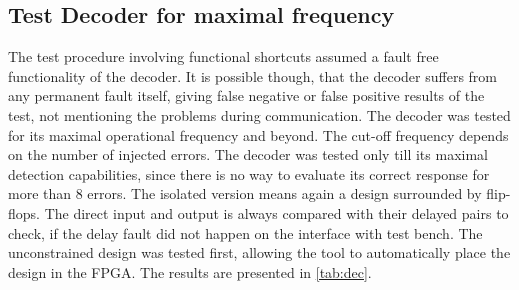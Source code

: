 \subsection{Test Decoder for maximal frequency}

The test procedure involving functional shortcuts assumed a fault free functionality of the decoder. It is possible though, that the decoder suffers from any permanent fault itself, giving false negative or false positive results of the test, not mentioning the problems during communication. The decoder was tested for its maximal operational frequency and beyond. The cut-off frequency depends on the number of injected errors. The decoder was tested only till its maximal detection capabilities, since there is no way to evaluate its correct response for more than 8 errors. The isolated version means again a design surrounded by flip-flops. The direct input and output is always compared with their delayed pairs to check, if the delay fault did not happen on the interface with test bench. The unconstrained design was tested first, allowing the tool to automatically place the design in the FPGA. The results are presented in \autoref{tab:dec}.

